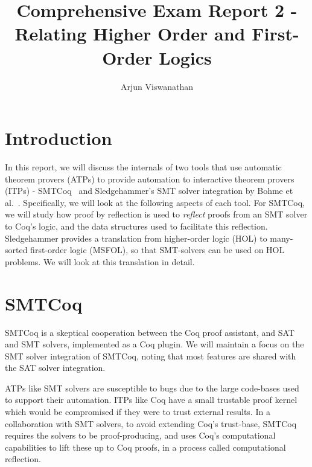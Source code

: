 \documentclass{article}
\begin{document}
\title{Comprehensive Exam Report 2 - Relating Higher Order and First-Order Logics}
\author{Arjun Viswanathan}
\date{}
\maketitle

\section{Introduction}
\label{sec:intro}
	In this report, we will discuss the 
	internals of two tools that use 
	automatic theorem provers (ATPs) to 
	provide automation to interactive 
	theorem provers (ITPs) - 
	SMTCoq~\cite{DBLP:phd/hal/Keller13} 
	and Sledgehammer's SMT solver 
	integration by Bohme et al.~\cite{bohme}. 
	Specifically, we will look at the 
	following aspects of each tool. For 
	SMTCoq, we will study 
	how proof by reflection is used to 
	\textit{reflect} proofs from an SMT 
	solver to Coq's logic, and the data 
	structures used to facilitate this 
	reflection.	Sledgehammer provides a 
	translation from higher-order logic 
	(HOL) to many-sorted first-order logic 
	(MSFOL), so that SMT-solvers can be 
	used on HOL problems. We will look at 
	this translation in detail.

\section{SMTCoq}
\label{sec:smtcoq}
	SMTCoq is a skeptical cooperation 
	between the Coq proof assistant, and 
	SAT and SMT solvers, implemented as a 
	Coq plugin. We will maintain a focus 
	on the SMT solver integration of 
	SMTCoq, noting that most features are 
	shared with the SAT	solver integration.
	
	ATPs like SMT solvers are susceptible 
	to bugs due to the large code-bases 
	used to support	their automation. 
	ITPs like Coq have a small trustable 
	proof kernel which would be 
	compromised if they were to trust
	external results. In a collaboration
	with SMT solvers, to avoid extending 
	Coq's trust-base, SMTCoq requires the 
	solvers to be proof-producing, and uses 
	Coq's computational capabilities 
	to lift these up to Coq proofs, in a 
	process called computational 
	reflection.
	
\end{document}
